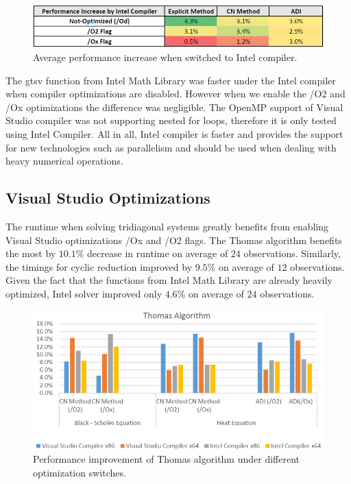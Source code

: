 \documentclass[12pt, oneside]{book}
\theoremstyle{plain}
\theoremstyle{definition}
\begin{document}
\begin{figure}[!htb]
    \centering
        \includegraphics[scale=0.65]{compilerPercent.png}
    \caption{Average performance increase when switched to Intel compiler.}
\end{figure}

The gtsv function from Intel Math Library was faster under the Intel compiler when compiler optimizations are disabled. However when we enable the /O2 and /Ox optimizations the difference was negligible. The OpenMP support of Visual Studio compiler was not supporting nested for loops, therefore it is only tested using Intel Compiler. All in all, Intel compiler is faster and provides the support for new technologies such as parallelism and should be used when dealing with heavy numerical operations.

\subsection{Visual Studio Optimizations}
The runtime when solving tridiagonal systems greatly benefits from enabling Visual Studio optimizations /Ox and /O2 flags. The Thomas algorithm benefits the most by $10.1 \%$ decrease in runtime on average of $24$ observations. Similarly, the timings for cyclic reduction improved  by $9.5 \%$ on average of $12$ observations. Given the fact that the functions from Intel Math Library are already heavily optimized,  Intel solver improved only $4.6 \%$ on average of $24$ observations. 

\begin{figure}[!htb]
    \centering
    \includegraphics[scale=0.6]{thomasFlagBar.png}
    \caption{Performance improvement of Thomas algorithm under different optimization switches.}
\end{figure}
\end{document}

